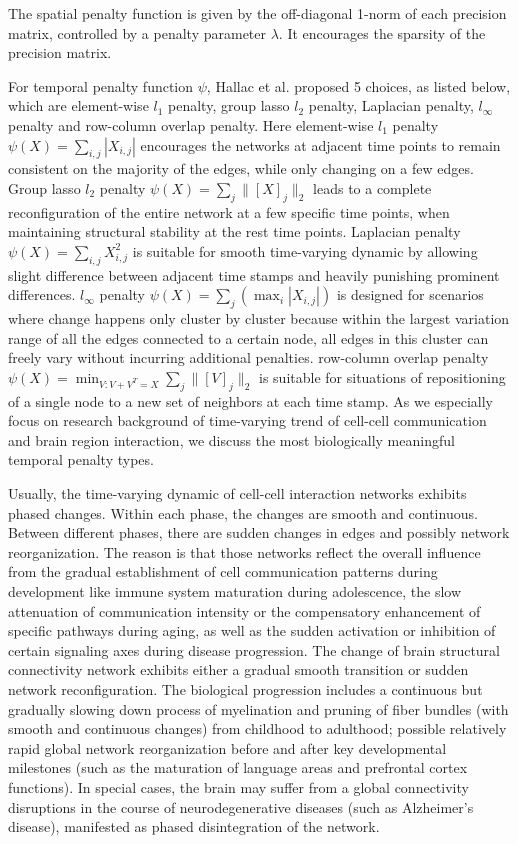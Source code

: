 The spatial penalty function is given by the off-diagonal 1-norm of each precision matrix, 
controlled by a penalty parameter $\lambda$. 
It encourages the sparsity of the precision matrix.

For temporal penalty function $\psi$, 
Hallac et al.\cite{hallac2017networkinferencetimevaryinggraphical} proposed 5 choices, as listed below, 
which are element-wise $l_1$ penalty, group lasso $l_2$ penalty, Laplacian penalty, 
$l_{\infty}$ penalty and row-column overlap penalty. 
Here element-wise $l_1$ penalty $\psi(X)=\sum_{i,j}|X_{i,j}|$ 
encourages the networks at adjacent time points to remain consistent on the majority of the edges, 
while only changing on a few edges. 
Group lasso $l_2$ penalty $\psi(X)=\sum_{j}\|[X]_j\|_2$ 
leads to a complete reconfiguration of the entire network at a few specific time points, 
when maintaining structural stability at the rest time points.
Laplacian penalty $\psi(X)=\sum_{i,j}X_{i,j}^2$ is suitable for smooth time-varying dynamic 
by allowing slight difference between adjacent time stamps and heavily punishing prominent differences. 
$l_{\infty}$ penalty $\psi(X)=\sum_{j}(\max_i|X_{i,j}|)$ is designed for scenarios where change happens only cluster by cluster
because within the largest variation range of all the edges connected to a certain node, 
all edges in this cluster can freely vary without incurring additional penalties.
row-column overlap penalty $\psi(X)=\min_{V:V+V^T=X}\sum_{j}\|[V]_j\|_2$ is suitable for situations of repositioning of a single node to a new set of neighbors at each time stamp.
As we especially focus on research background of time-varying trend of cell-cell communication and brain region interaction, 
we discuss the most biologically meaningful temporal penalty types.

Usually, the time-varying dynamic of cell-cell interaction networks exhibits phased changes. 
Within each phase, the changes are smooth and continuous. 
Between different phases, there are sudden changes in edges and possibly network reorganization.
The reason is that those networks reflect the overall influence from 
the gradual establishment of cell communication patterns during development like immune system maturation during adolescence, 
the slow attenuation of communication intensity or the compensatory enhancement of specific pathways during aging, 
as well as the sudden activation or inhibition of certain signaling axes during disease progression. 
The change of brain structural connectivity network exhibits either a gradual smooth transition or sudden network reconfiguration.
The biological progression includes a continuous but gradually slowing down process of myelination and pruning of fiber bundles (with smooth and continuous changes) from childhood to adulthood;
possible relatively rapid global network reorganization before and after key developmental milestones (such as the maturation of language areas and prefrontal cortex functions).  
In special cases, the brain may suffer from a global connectivity disruptions in the course of neurodegenerative diseases (such as Alzheimer's disease), manifested as phased disintegration of the network.

